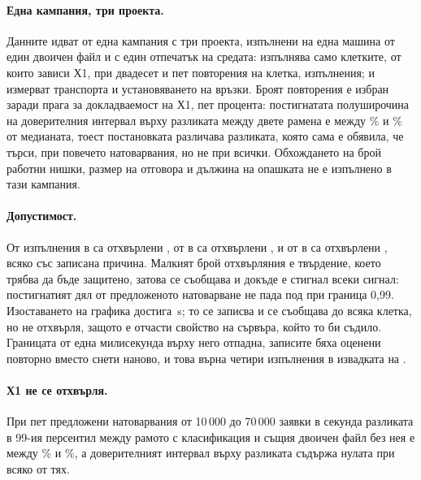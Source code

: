 \paragraph{Една кампания, три проекта.} Данните идват от една кампания с три проекта, изпълнени
на една машина от един двоичен файл и с един отпечатък на средата:  изпълнява
само клетките, от които зависи Х1, при двадесет и пет повторения на клетка, 
изпълнения;  и  измерват транспорта и установяването на връзки.
Броят повторения е избран заради прага за докладваемост на Х1, пет процента: постигнатата
полуширочина на доверителния интервал върху разликата между двете рамена е между
\% и \% от медианата, тоест
постановката различава разликата, която сама е обявила, че търси, при повечето натоварвания,
но не при всички. Обхождането на брой работни нишки, размер на отговора и дължина на опашката
не е изпълнено в тази кампания.

\paragraph{Допустимост.} От  изпълнения в  са отхвърлени
, от  в  са отхвърлени
, и от  в  са отхвърлени
, всяко със записана причина. Малкият брой отхвърляния е твърдение,
което трябва да бъде защитено, затова се съобщава и докъде е стигнал всеки сигнал: постигнатият
дял от предложеното натоварване не пада под  при граница 0,99.
Изоставането на графика достига \,\textmu s; то се записва и се
съобщава до всяка клетка, но не отхвърля, защото е отчасти свойство на сървъра, който то би съдило.
Границата от една милисекунда върху него отпадна, записите бяха оценени повторно вместо снети
наново, и това върна четири изпълнения в извадката на .

\paragraph{Х1 не се отхвърля.} При пет предложени натоварвания от 10\,000 до 70\,000 заявки в
секунда разликата в 99-ия персентил между рамото с класификация и същия двоичен файл без нея е
между \% и \%, а доверителният интервал върху
разликата съдържа нулата при всяко от тях.

